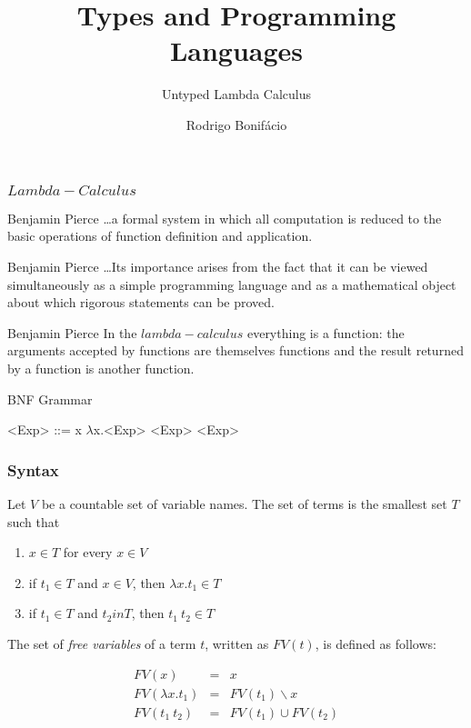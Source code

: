 \documentclass{beamer}
\title{Types and Programming Languages}
\subtitle{Untyped Lambda Calculus}
\author{Rodrigo Bonif\'{a}cio}
\begin{document}
\setlength{\grammarparsep}{20pt plus 1pt minus 1pt} 
\setlength{\grammarindent}{4em}

\begin{frame}
\titlepage
\end{frame}

\begin{frame}
  \frametitle{$Lambda-Calculus$} 
\begin{shadequote}[l]{Benjamin Pierce}
  \ldots a formal system in which all computation
  is reduced to the basic operations of function definition
  and application. 
\end{shadequote}\pause

\begin{shadequote}[l]{Benjamin Pierce}
  \ldots Its importance arises from
  the fact that it can be viewed simultaneously as a {\color{blue}simple
  programming language and as a mathematical object} about
  which rigorous statements can be proved.
\end{shadequote}

\end{frame}

\begin{frame}

  \begin{shadequote}[l]{Benjamin Pierce}
    In the $lambda-calculus$ everything is a function: the arguments
    accepted by functions are themselves functions and the result returned
    by a function is another function. 
  \end{shadequote} \pause

  \begin{block}{BNF Grammar}
    \begin{grammar}
      <Exp> ::= x
      \alt      $\lambda$x.<Exp>
      \alt      <Exp> <Exp> 
    \end{grammar}  
  \end{block}
\end{frame}

\begin{frame}
  \frametitle{Syntax}

  Let $V$ be a countable set of variable names. The
  set of terms is the smallest set $T$ such that

  \begin{enumerate}
    \item $x \in T$ for every $x \in V$
    \item if $t_1 \in T$ and $x \in V$, then $\lambda x.t_1 \in T$
    \item if $t_1 \in T$ and $t_2 in T$, then $t_1\ t_2 \in T$   
  \end{enumerate}

  \pause
  The set of \emph{free variables} of a term $t$, written as
  $FV(t)$, is defined as follows:

  \begin{eqnarray*}
    FV(x) & = & {x} \\
    FV(\lambda x . t_1) & = &  FV(t_1) \backslash {x} \\
    FV(t_1\ t_2) & = & FV(t_1) \cup FV(t_2) 
  \end{eqnarray*}
  
\end{frame}
\end{document}
